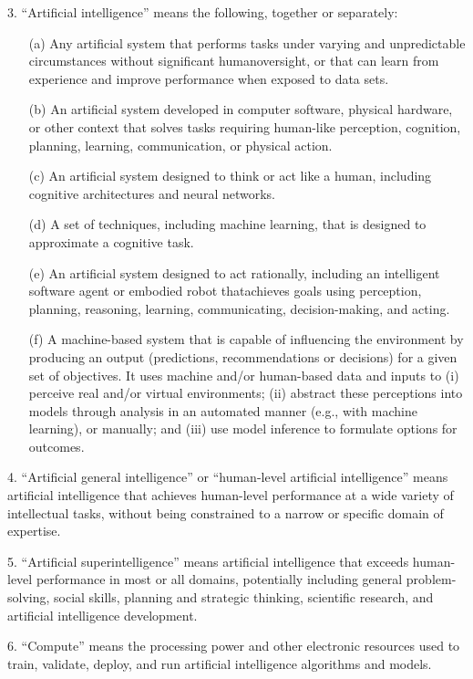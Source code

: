 \documentclass[12pt,a4paper]{article}
\begin{document}
3. “Artificial intelligence” means the following, together or separately:

\begin{enumerate}
\item[(a)] Any artificial system that performs tasks under varying and unpredictable circumstances without significant humanoversight, or that can learn from experience and improve performance when exposed to data sets.
\item[(b)] An artificial system developed in computer software, physical hardware, or other context that solves tasks requiring human-like perception, cognition, planning, learning, communication, or physical action.
\item[(c)] An artificial system designed to think or act like a human, including cognitive architectures and neural networks.
\item[(d)]A set of techniques, including machine learning, that is designed to approximate a cognitive task.
\item[(e)]An artificial system designed to act rationally, including an intelligent software agent or embodied robot thatachieves goals using perception, planning, reasoning, learning, communicating, decision-making, and acting.
\item[(f)] A machine-based system that is capable of influencing the environment by producing an output (predictions, recommendations or decisions) for a given set of objectives. It uses machine and/or human-based data and inputs to (i) perceive real and/or virtual environments; (ii) abstract these perceptions into models through analysis in an automated manner (e.g., with machine learning), or manually; and (iii) use model inference to formulate options for outcomes. 
\end{enumerate}

4. “Artificial general intelligence” or “human-level artificial intelligence” means artificial intelligence that achieves human-level performance at a wide variety of intellectual tasks, without being constrained to a narrow or specific domain of expertise.

5. “Artificial superintelligence” means artificial intelligence that exceeds human-level performance in most or all domains, potentially including general problem-solving, social skills, planning and strategic thinking, scientific research, and artificial intelligence development. 

6. “Compute” means the processing power and other electronic resources used to train, validate, deploy, and run artificial intelligence algorithms and models. 
\end{document}
